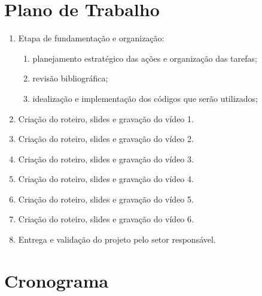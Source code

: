 \documentclass[a4paper,10pt]{article} %
\begin{document}

\section{Plano de Trabalho}

 \begin{enumerate}
  \item Etapa de fundamentação e organização:
      \begin{enumerate}
         \item planejamento estratégico das ações e organização das tarefas;
         \item revisão bibliográfica;
         \item idealização e implementação dos códigos que serão utilizados;
      \end{enumerate}    
  \item Criação do roteiro, slides e gravação do vídeo 1.
  \item Criação do roteiro, slides e gravação do vídeo 2.
  \item Criação do roteiro, slides e gravação do vídeo 3.
  \item Criação do roteiro, slides e gravação do vídeo 4.
  \item Criação do roteiro, slides e gravação do vídeo 5.
  \item Criação do roteiro, slides e gravação do vídeo 6.
  \item Entrega e validação do projeto pelo setor responsável.
\end{enumerate}

\section{Cronograma}
\end{document}
